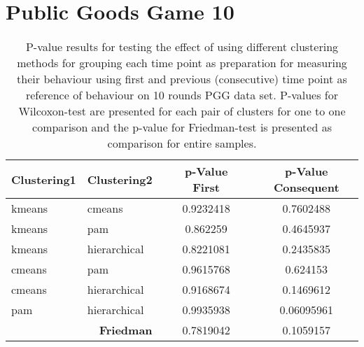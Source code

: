 \section{Public Goods Game 10}


\begin{table}[H]
	\centering
	\caption{P-value results for testing the effect of using different clustering methods for grouping each time point as preparation  for measuring their behaviour using first and previous (consecutive) time point as reference of behaviour on 10 rounds PGG data set. P-values for Wilcoxon-test are presented for each pair of clusters for one to one comparison and the p-value for Friedman-test is presented as comparison for entire samples.}
	\label{tab:Pvalue10PGGClusterDiff}
	\begin{tabular}{@{}llcccc@{}}\toprule
		Clustering1              & Clustering2       &\phantom{abc}        & p-Value First   &\phantom{abc}  & p-Value Consequent \\ \midrule
		kmeans                   & cmeans       &\phantom{abc}             & 0.9232418   &\phantom{abc}  & 0.7602488          \\
		kmeans                   & pam           &\phantom{abc}            & 0.862259   &\phantom{abc}   & 0.4645937          \\
		kmeans                   & hierarchical  &\phantom{abc}            & 0.8221081   &\phantom{abc}  & 0.2435835          \\
		cmeans                   & pam           &\phantom{abc}            & 0.9615768   &\phantom{abc}  & 0.624153           \\
		cmeans                   & hierarchical  &\phantom{abc}           & 0.9168674    &\phantom{abc} & 0.1469612          \\
		pam                      & hierarchical  &\phantom{abc}           & 0.9935938   &\phantom{abc}  & 0.06095961         \\ \hline
		\multicolumn{2}{r}{\textbf{Friedman}} &\phantom{abc} & 0.7819042 &\phantom{abc}    & 0.1059157    \\
		\bottomrule     
	\end{tabular}
\end{table}


